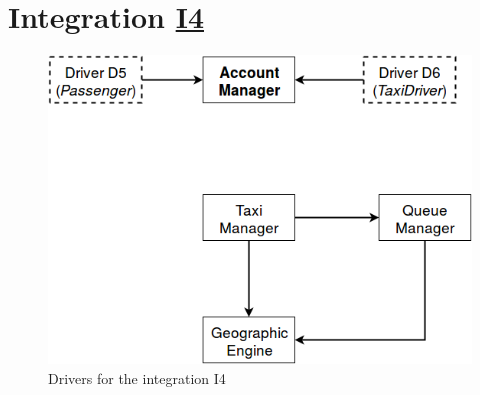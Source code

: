 \section{Integration \hyperref[I4]{I4} \label{int_I4}}

\begin{figure}[H]
\centering
\includegraphics[scale = 0.5]{"../Analysis Documents/I4"}
\caption{Drivers for the integration I4}
\end{figure}